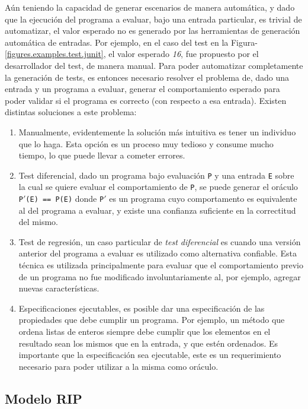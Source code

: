 A\'un teniendo la capacidad de generar escenarios de manera autom\'atica, y dado que la ejecuci\'on del programa a evaluar, bajo una entrada particular, es trivial de automatizar, el valor esperado no es generado por las herramientas de generaci\'on autom\'atica de entradas. Por ejemplo, en el caso del test en la Figura-\ref{figures.examples.test.junit}, el valor esperado \emph{16}, fue propuesto por el desarrollador del test, de manera manual. Para poder automatizar completamente la generaci\'on de tests, es entonces necesario resolver el problema de, dado una entrada y un programa a evaluar, generar el comportamiento esperado para poder validar si el programa es correcto (con respecto a esa entrada). Existen distintas soluciones a este problema:
\begin{enumerate}
	\item Manualmente, evidentemente la soluci\'on m\'as intuitiva es tener un individuo que lo haga. Esta opci\'on es un proceso muy tedioso y consume mucho tiempo, lo que puede llevar a cometer errores.
	
	\item Test diferencial, dado un programa bajo evaluaci\'on \texttt{P} y una entrada \texttt{E} sobre la cual se quiere evaluar el comportamiento de \texttt{P}, se puede generar el or\'aculo \texttt{P$\prime$(E) == P(E)} donde \texttt{P$\prime$} es un programa cuyo comportamento es equivalente al del programa a evaluar, y existe una confianza suficiente en la correctitud del mismo.
	
	\item Test de regresi\'on, un caso particular de \emph{test diferencial} es cuando una versi\'on anterior del programa a evaluar es utilizado como alternativa confiable. Esta t\'ecnica es utilizada principalmente para evaluar que el comportamiento previo de un programa no fue modificado involuntariamente al, por ejemplo, agregar nuevas caracter\'isticas.
	
	\item Especificaciones ejecutables, es posible dar una especificaci\'on de las propiedades que debe cumplir un programa. Por ejemplo, un m\'etodo que ordena listas de enteros siempre debe cumplir que los elementos en el resultado sean los mismos que en la entrada, y que est\'en ordenados. Es importante que la especificaci\'on sea ejecutable, este es un requerimiento necesario para poder utilizar a la misma como or\'aculo.
\end{enumerate}

\subsection{Modelo RIP}

